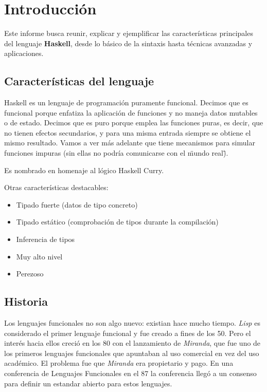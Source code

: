 \section{Introducción} %
\label{sec:introducci_n}

Este informe busca reunir, explicar y ejemplificar las características principales del lenguaje \textbf{Haskell}, desde lo básico de la sintaxis hasta técnicas avanzadas y aplicaciones.

\subsection{Características del lenguaje} %
\label{sub:caracter_sticas_del_lenguaje}

Haskell es un lenguaje de programación puramente funcional. Decimos que es funcional porque enfatiza la aplicación de funciones y no maneja datos mutables o de estado. Decimos que es puro porque emplea las funciones puras, es decir, que no tienen efectos secundarios, y para una misma entrada siempre se obtiene el mismo resultado. Vamos a ver más adelante que tiene mecanismos para simular funciones impuras (sin ellas no podría comunicarse con el \"mundo real\").

Es nombrado en homenaje al lógico Haskell Curry.

Otras características destacables:

\begin{itemize}
  \item Tipado fuerte (datos de tipo concreto)
  \item Tipado estático (comprobación de tipos durante la compilación)
  \item Inferencia de tipos
  \item Muy alto nivel
  \item Perezoso
\end{itemize}

\subsection{Historia} %
\label{sub:historia}

Los lenguajes funcionales no son algo nuevo: existian hace mucho tiempo. \textit{Lisp} es considerado el primer lenguaje funcional y fue creado a fines de los 50. Pero el interés hacia ellos creció en los 80 con el lanzamiento de \textit{Miranda}, que fue uno de los primeros lenguajes funcionales que apuntaban al uso comercial en vez del uso académico. El problema fue que \textit{Miranda} era propietario y pago. En una conferencia de Lenguajes Funcionales en el 87 la conferencia llegó a un consenso para definir un estandar abierto para estos lenguajes.


